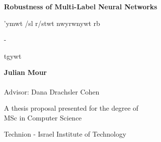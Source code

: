
\begin{titlepage}
   \begin{center}

       \huge
       \textbf{Robustness of Multi-Label Neural Networks}

       \vspace*{1cm}


       \begin{cjhebrew} 'ymwt /sl r/stwt nwyrwnywt rb\end{cjhebrew}-\begin{cjhebrew}tgywt\end{cjhebrew}




%

       \vspace{2.5cm}

        \Large
        \textbf{Julian Mour} \\
        \\
        Advisor: Dana Drachsler Cohen\\


       \vfill

       A thesis proposal presented for the degree of\\
       MSc in Computer Science

       \vspace{0.8cm}


       Technion - Israel Institute of Technology\\

   \end{center}
\end{titlepage}